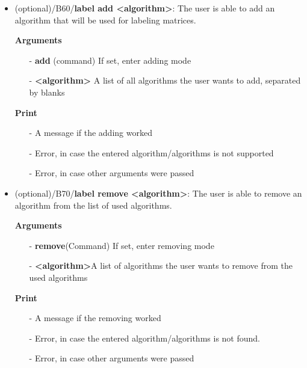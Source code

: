 \documentclass[parskip=full]{scrartcl}
\begin{document}
\begin{itemize}
\textbf{Arguments}
	\begin{itemize}
	\item[-]\textbf{list} (command) If set, enter list mode
	\end{itemize}

\textbf{Print}
	\begin{itemize}
	\item[-]A list of all \glspl{algorithm} the \gls{labeling module} currently uses and is able to use
	\item[-]Error, in case the user passed more arguments
	\end{itemize}

\item(optional)/B60/\textbf{label add <algorithm>}:
\newline The user is able to add an \gls{algorithm} that will be used for labeling matrices.

\textbf{Arguments}
	\begin{itemize}
	\item[-]\textbf{add} (command) If set, enter adding mode
	\item[-]\textbf{<algorithm>} A list of all \glspl{algorithm} the user wants to add, separated by blanks
	\end{itemize}
\textbf{Print}
	\begin{itemize}
	\item[-]A message if the adding worked
	\item[-]Error, in case the entered \gls{algorithm}/\glspl{algorithm} is not supported 
	\item[-]Error, in case other arguments were passed
	\end{itemize}

\item(optional)/B70/\textbf{label remove <algorithm>}:
\newline The user is able to remove an \gls{algorithm} from the list of used algorithms.

\textbf{Arguments}
	\begin{itemize}
	\item[-]\textbf{remove}(Command) If set, enter removing mode
	\item[-]\textbf{<algorithm>}A list of \glspl{algorithm} the user wants to remove from the used algorithms
	\end{itemize}
\textbf{Print}
	\begin{itemize}
	\item[-]A message if the removing worked
	\item[-]Error, in case the entered \gls{algorithm}/\glspl{algorithm} is not found. 
	\item[-]Error, in case other arguments were passed
	\end{itemize}

\end{itemize}
\clearpage
\end{document}
